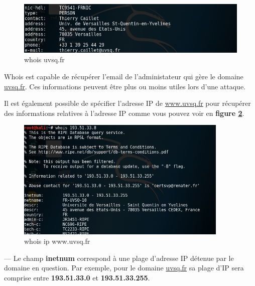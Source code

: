 \begin{figure}[htp!]
  \centering
  \setlength\figureheight{7cm}
  \setlength\figurewidth{9cm}
  \includegraphics[width=1\textwidth]{oui/images/Whois/whois3.PNG}
  \caption{whois uvsq.fr}
  \label{fig:whoisdns}
\end{figure}

\noindent Whois est capable de récupérer l'email de l'administateur qui gère le domaine \url{uvsq.fr}. Ces informations peuvent être plus ou moins utiles lors d'une attaque.

Il est également possible de spécifier l'adresse IP de \url{www.uvsq.fr} pour récupérer des informations relatives à l'adresse IP comme vous pouvez voir en \textbf{figure \ref{fig:whoisip}}.

\begin{figure}[b!]
  \centering
  \setlength\figureheight{7cm}
  \setlength\figurewidth{9cm}
  \includegraphics[width=0.9\textwidth]{oui/images/Whois/whois4.PNG}
  \caption{whois ip www.uvsq.fr}
  \label{fig:whoisip}
\end{figure}
\noindent --- Le champ \textbf{inetnum} correspond à une plage d'adresse IP détenue par le domaine en question. Par exemple, pour le domaine \url{uvsq.fr} sa plage d'IP sera comprise entre \textbf{193.51.33.0} et \textbf{193.51.33.255}.\\

